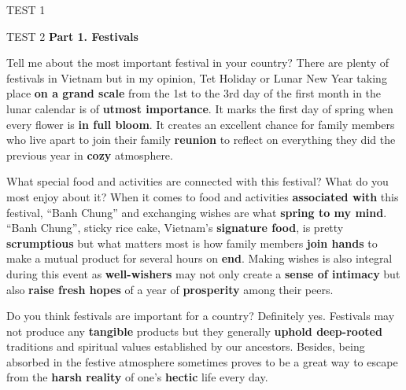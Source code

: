 \documentclass[a4paper,12pt]{article}
\begin{document}
\begin{glossarymc}[Cambridge 3]
\begin{test}{TEST 1}
\begin{VocabHighlights}
\end{VocabHighlights}
\end{test}

\newpage
\begin{test}{TEST 2}
\textbf{Part 1. Festivals}

\begin{qa}{Tell me about the most important festival in your country?}
There are plenty of festivals in Vietnam but in my opinion, Tet Holiday or Lunar New Year taking place \textbf{on a grand scale} from the 1st to the 3rd day of the first month in the lunar calendar is of \textbf{utmost importance}. It marks the first day of spring when every flower is \textbf{in full bloom}. It creates an excellent chance for family members who live apart to join their family \textbf{reunion} to reflect on everything they did the previous year in \textbf{cozy} atmosphere.
\end{qa}

\begin{qa}{What special food and activities are connected with this festival? What do you most enjoy about it?}
When it comes to food and activities \textbf{associated with} this festival, ``Banh Chung'' and exchanging wishes are what \textbf{spring to my mind}. ``Banh Chung'', sticky rice cake, Vietnam's \textbf{signature food}, is pretty \textbf{scrumptious} but what matters most is how family members \textbf{join hands} to make a mutual product for several hours on \textbf{end}. Making wishes is also integral during this event as \textbf{well-wishers} may not only create a \textbf{sense of intimacy} but also \textbf{raise fresh hopes} of a year of \textbf{prosperity} among their peers.
\end{qa}

\begin{qa}{Do you think festivals are important for a country?}
Definitely yes. Festivals may not produce any \textbf{tangible} products but they generally \textbf{uphold deep-rooted} traditions and spiritual values established by our ancestors. Besides, being absorbed in the festive atmosphere sometimes proves to be a great way to escape from the \textbf{harsh reality} of one's \textbf{hectic} life every day.
\end{qa}


\end{test}
\end{glossarymc}
\end{document}
